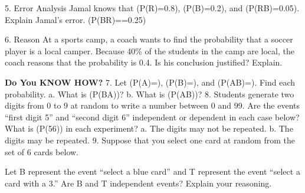 \documentclass{article}
\newenvironment{concept-summary}{}{}    %
\newcommand{\answer}[1]{}               %
\newcommand{\placeholder}[2]{}          %
\newcommand{\te}[1]{}                   %
\begin{document}
\begin{concept-summary}
\answer{From the formula for conditional probability, both (P(A)\cdot P(B\mid A)) and (P(B)\cdot P(A\mid B)) are equal to (P(A\text{ and }B)).}
5. Error Analysis Jamal knows that (P(R)=0.8), (P(B)=0.2), and (P(RB)=0.05). Explain Jamal's error.
(P(B\mid R)==0.25)
\te{Printed erroneous work marked with red X.}
\answer{Jamal divided (P(R\text{ and }B)) by (P(B)) and found (P(R\mid B)) instead of (P(B\mid R)). (P(B\mid R)=\frac{0.05}{0.8}=0.0625)}
6. Reason At a sports camp, a coach wants to find the probability that a soccer player is a local camper. Because 40\% of the students in the camp are local, the coach reasons that the probability is 0.4. Is his conclusion justified? Explain.
\answer{No; The coach does not know whether local and non-local campers are equally likely to play soccer.}
\textbf{Do You KNOW HOW?}
7. Let (P(A)=), (P(B)=), and (P(AB)=). Find each probability.
a. What is (P(B\mid A))? \answer{a. (P(B\mid A)=\frac23)}
b. What is (P(A\mid B))? \answer{b. (P(A\mid B)=\frac34)}
8. Students generate two digits from 0 to 9 at random to write a number between 0 and 99. Are the events “first digit 5” and “second digit 6” independent or dependent in each case below? What is (P(56)) in each experiment?
a. The digits may not be repeated. \answer{a. dependent; (\frac1{90})}
b. The digits may be repeated. \answer{b. independent; (\frac1{100})}
9. Suppose that you select one card at random from the set of 6 cards below.
\placeholder{diagram}{Six cards in a row: W2 white, B3 blue, W4 white, B3 blue, B2 blue, W3 white.}
Let B represent the event “select a blue card” and T represent the event “select a card with a 3.” Are B and T independent events? Explain your reasoning.
\answer{No; (P(B\text{ and }T)=\frac13), (P(T)=\frac12), and (P(B)=\frac12). For the events to be independent, (P(B\mid T)=\frac{P(B\text{ and }T)}{P(T)}=P(B)) has to be true. But (\frac{\frac13}{\frac12}=\frac23\neq\frac12), so the events are not independent.}
\end{concept-summary}
\end{document}
